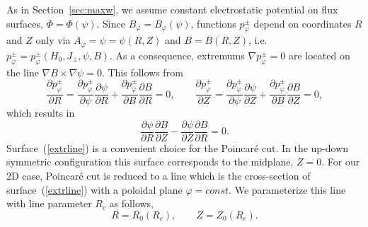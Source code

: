 \documentclass[preprint,prb,aps]{revtex4-1}
\newcommand{\be}[1]{\begin{equation} \label{#1}}
\newcommand{\ee}{\end{equation}}
\newcommand{\eq}[1]{(\ref{#1})}
\newcommand{\difp}[2]{\frac{\partial #1}{\partial #2}}
\begin{document}
\noindent
As in Section~\ref{sec:maxw}, we assume constant electrostatic potential on flux surfaces,
$\Phi=\Phi(\psi)$. Since $B_\varphi=B_\varphi(\psi)$, 
functions $p_\varphi^\pm$ depend on coordinates $R$ and $Z$ only via
$A_\varphi=\psi=\psi(R,Z)$ and $B=B(R,Z)$, 
i.e. $p_\varphi^\pm=p_\varphi^\pm(H_0,J_\perp,\psi,B)$. 
As a consequence, extremums $\nabla p_\varphi^\pm = 0$ are located on the line 
$\nabla B \times \nabla \psi =0$. This follows from
$$
\difp{p_\varphi^\pm}{R}=\difp{p_\varphi^\pm}{\psi}\difp{\psi}{R}
+\difp{p_\varphi^\pm}{B}\difp{B}{R}=0,
\qquad
\difp{p_\varphi^\pm}{Z}=\difp{p_\varphi^\pm}{\psi}\difp{\psi}{Z}
+\difp{p_\varphi^\pm}{B}\difp{B}{Z}=0,
$$
which results in
\be{extrline}
\difp{\psi}{R}\difp{B}{Z}-\difp{\psi}{Z}\difp{B}{R}=0.
\ee
Surface~\eq{extrline} is a convenient choice for the Poincar\'e cut.
In the up-down symmetric configuration this surface corresponds to the midplane, $Z=0$.
For our 2D case, Poincar\'e cut is reduced to a line which is
the cross-section of surface~\eq{extrline} with a poloidal plane $\varphi=const$.
We parameterize this line with line parameter $R_c$ as follows,
\be{poiparam}
R=R_0(R_c), \qquad Z=Z_0(R_c).
\ee
\end{document}
